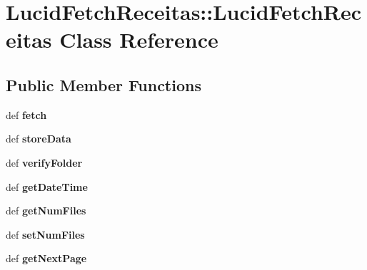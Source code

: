 \hypertarget{classLucidFetchReceitas_1_1LucidFetchReceitas}{
\section{LucidFetchReceitas::LucidFetchReceitas Class Reference}
\label{classLucidFetchReceitas_1_1LucidFetchReceitas}
}
\subsection*{Public Member Functions}
\begin{DoxyCompactItemize}
\item 
\hypertarget{classLucidFetchReceitas_1_1LucidFetchReceitas_a758ef5c6568ca9d4024f827b9c0ddac0}{
def {\bfseries fetch}}
\label{classLucidFetchReceitas_1_1LucidFetchReceitas_a758ef5c6568ca9d4024f827b9c0ddac0}

\item 
\hypertarget{classLucidFetchReceitas_1_1LucidFetchReceitas_acdc9d9d71744ef3660b7b5b9052372d3}{
def {\bfseries storeData}}
\label{classLucidFetchReceitas_1_1LucidFetchReceitas_acdc9d9d71744ef3660b7b5b9052372d3}

\item 
\hypertarget{classLucidFetchReceitas_1_1LucidFetchReceitas_a404c9595bca7b361c4e12bf5c2478c55}{
def {\bfseries verifyFolder}}
\label{classLucidFetchReceitas_1_1LucidFetchReceitas_a404c9595bca7b361c4e12bf5c2478c55}

\item 
\hypertarget{classLucidFetchReceitas_1_1LucidFetchReceitas_a382591947af9088eb20a3a29aa931a78}{
def {\bfseries getDateTime}}
\label{classLucidFetchReceitas_1_1LucidFetchReceitas_a382591947af9088eb20a3a29aa931a78}

\item 
\hypertarget{classLucidFetchReceitas_1_1LucidFetchReceitas_a0f409f06b0ca4d43b05ccd1096055716}{
def {\bfseries getNumFiles}}
\label{classLucidFetchReceitas_1_1LucidFetchReceitas_a0f409f06b0ca4d43b05ccd1096055716}

\item 
\hypertarget{classLucidFetchReceitas_1_1LucidFetchReceitas_a219d0b961b45b996e6237af8bfb389e2}{
def {\bfseries setNumFiles}}
\label{classLucidFetchReceitas_1_1LucidFetchReceitas_a219d0b961b45b996e6237af8bfb389e2}

\item 
\hypertarget{classLucidFetchReceitas_1_1LucidFetchReceitas_a54f88f046c6683872704b763e80ebc61}{
def {\bfseries getNextPage}}
\label{classLucidFetchReceitas_1_1LucidFetchReceitas_a54f88f046c6683872704b763e80ebc61}

\end{DoxyCompactItemize}
